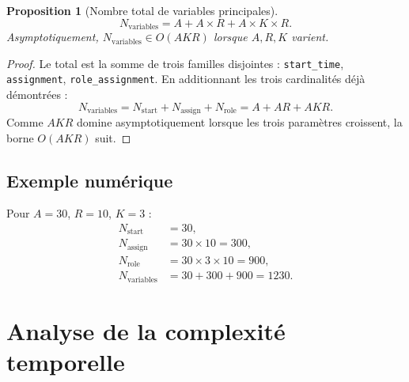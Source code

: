 \documentclass[12pt,a4paper]{article}
\newtheorem{proposition}{Proposition}[section]
\begin{document}
\begin{proposition}[Nombre total de variables principales]
\begin{equation}
N_{\text{variables}} = A + A\times R + A\times K\times R.
\end{equation}
Asymptotiquement, $N_{\text{variables}}\in O(AKR)$ lorsque $A,R,K$ varient.
\end{proposition}
\begin{proof}
Le total est la somme de trois familles disjointes : \texttt{start\_time}, \texttt{assignment}, \texttt{role\_assignment}. En additionnant les trois cardinalités déjà démontrées :
\[
N_{\text{variables}} = N_{\text{start}} + N_{\text{assign}} + N_{\text{role}} = A + AR + AKR.
\]
Comme $AKR$ domine asymptotiquement lorsque les trois paramètres croissent, la borne $O(AKR)$ suit.
\end{proof}

\subsection{Exemple numérique}
Pour $A=30$, $R=10$, $K=3$ :
\begin{align*}
N_{\text{start}} &= 30,\\
N_{\text{assign}} &= 30\times 10 = 300,\\
N_{\text{role}} &= 30\times 3\times 10 = 900,\\
N_{\text{variables}} &= 30 + 300 + 900 = 1230.
\end{align*}

\section{Analyse de la complexité temporelle}
\end{document}
